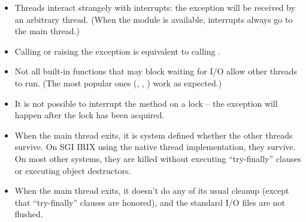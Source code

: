 \begin{itemize}
\item
Threads interact strangely with interrupts: the
 exception will be received by an arbitrary
thread.  (When the  module is
available, interrupts always go to the main thread.)

\item
Calling  or raising the  exception is
equivalent to calling .

\item
Not all built-in functions that may block waiting for I/O allow other
threads to run.  (The most popular ones (, ,
) work as expected.)

\item
It is not possible to interrupt the  method on a lock
-- the  exception will happen after the lock
has been acquired.

\item
When the main thread exits, it is system defined whether the other
threads survive.  On SGI IRIX using the native thread implementation,
they survive.  On most other systems, they are killed without
executing ``try-finally'' clauses or executing object destructors.

\item
When the main thread exits, it doesn't do any of its usual cleanup
(except that ``try-finally'' clauses are honored), and the standard
I/O files are not flushed.

\end{itemize}
